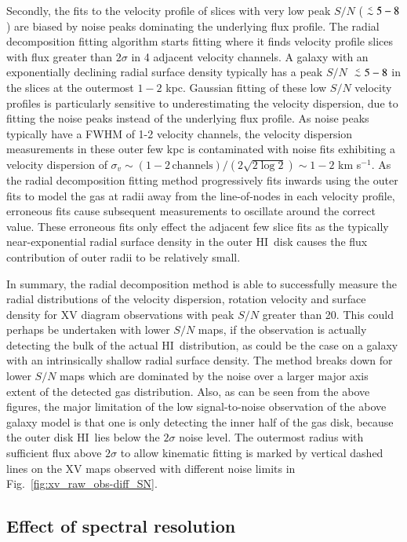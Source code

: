 \documentclass[traditabstract]{aa} %
\newcommand\lesim{\lower.5ex\hbox{$\; \buildrel < \over \sim \;$}}
\newcommand\HI{H{\small I}}
\newcommand\kms{km s$^{-1}$}
\begin{document}
Secondly, the fits to the velocity profile of slices with very low
peak $S/N$ ($\lesim 5-8$) are biased by noise peaks dominating the
underlying flux profile. The radial decomposition fitting algorithm
starts fitting where it finds velocity profile slices with flux
greater than $2\sigma$ in 4 adjacent velocity channels. A galaxy
with an exponentially declining radial surface density typically
has a peak $S/N$ $\lesim 5-8$ in the slices at  the outermost $1-2$ kpc.
Gaussian fitting of these low $S/N$ velocity profiles is particularly
sensitive to underestimating the velocity dispersion, due to fitting
the noise peaks instead of the underlying flux profile. As noise
peaks typically have a FWHM of 1-2 velocity channels, the velocity
dispersion measurements in these outer few kpc is contaminated with
noise fits exhibiting a velocity dispersion of $\sigma_v \sim
(1-2\,\textrm{channels}) / (2 \sqrt{2 \log 2} ) \sim 1-2$ \kms. As
the radial decomposition fitting method progressively fits inwards
using the outer fits to model the gas at radii away from the line-of-nodes
in each velocity profile, erroneous fits cause subsequent measurements
to oscillate around the correct value.  These erroneous fits only
effect the adjacent few slice fits as the typically near-exponential
radial surface density in the outer \HI\ disk causes the flux
contribution of outer radii to be relatively small.


In summary, the radial decomposition method is able to successfully measure
the radial distributions of the velocity dispersion, rotation
velocity and surface density for XV diagram observations with peak $S/N$ greater
than 20. This could perhaps be undertaken with lower $S/N$ maps, if the
observation is actually detecting the bulk of the actual \HI\
distribution, as could be the case on a galaxy with an intrinsically
shallow radial surface density. The method breaks down for lower $S/N$
maps which are dominated by the noise over a larger major axis extent
of the detected gas distribution. Also, as can be seen from the
above figures, the major limitation of the low signal-to-noise
observation of the above galaxy model is that one is only detecting
the inner half of the gas disk, because the outer disk \HI\ lies
below the $2\sigma$ noise level.  The outermost radius with sufficient
flux above $2\sigma$ to allow kinematic fitting is marked by vertical
dashed lines on the XV maps observed with different noise limits
in Fig.~\ref{fig:xv_raw_obs-diff_SN}.



\subsection{Effect of spectral resolution}
\label{sec:ch4-disc-eff-instr-broad}
\end{document}
